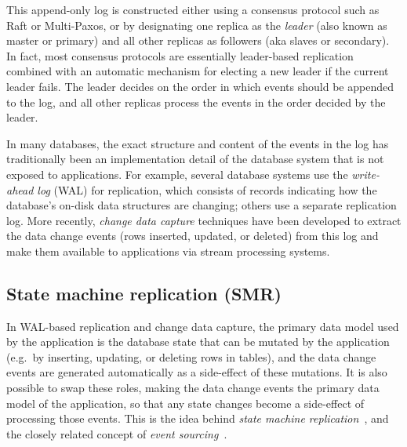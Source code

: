 \documentclass[sigconf,nonacm]{acmart}
\begin{document}
This append-only log is constructed either using a consensus protocol such as Raft or Multi-Paxos, or by designating one replica as the \emph{leader} (also known as master or primary) and all other replicas as followers (aka slaves or secondary).
In fact, most consensus protocols are essentially leader-based replication combined with an automatic mechanism for electing a new leader if the current leader fails.
The leader decides on the order in which events should be appended to the log, and all other replicas process the events in the order decided by the leader.

In many databases, the exact structure and content of the events in the log has traditionally been an implementation detail of the database system that is not exposed to applications.
For example, several database systems use the \emph{write-ahead log} (WAL) for replication, which consists of records indicating how the database's on-disk data structures are changing; others use a separate replication log.
More recently, \emph{change data capture} techniques have been developed to extract the data change events (rows inserted, updated, or deleted) from this log and make them available to applications via stream processing systems.

\subsection{State machine replication (SMR)}\label{sec:smr}

In WAL-based replication and change data capture, the primary data model used by the application is the database state that can be mutated by the application (e.g.\ by inserting, updating, or deleting rows in tables), and the data change events are generated automatically as a side-effect of these mutations.
It is also possible to swap these roles, making the data change events the primary data model of the application, so that any state changes become a side-effect of processing those events.
This is the idea behind \emph{state machine replication}~\cite{Schneider:1990}, and the closely related concept of \emph{event sourcing}~\cite{Fowler:2005}.
\end{document}
